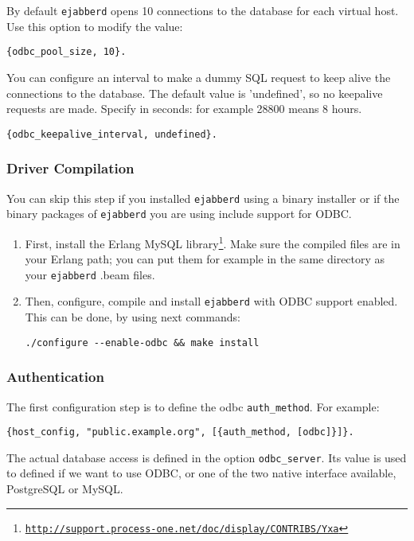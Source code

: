 \documentclass[a4paper,10pt]{book}
\newcommand{\ind}[1]{\begin{latexonly}\index{#1}\end{latexonly}}
\newcommand{\term}[1]{\texttt{#1}}
\newcommand{\ejabberd}{\texttt{ejabberd}}
\gdef\footahref#1#2{#2\footnote{\href{#1}{\texttt{#1}}}}
\begin{document}
By default \ejabberd{} opens 10 connections to the database for each virtual host.
Use this option to modify the value:
\begin{verbatim}
{odbc_pool_size, 10}.
\end{verbatim}

You can configure an interval to make a dummy SQL request 
to keep alive the connections to the database. 
The default value is 'undefined', so no keepalive requests are made. 
Specify in seconds: for example 28800 means 8 hours.
\begin{verbatim}
{odbc_keepalive_interval, undefined}.
\end{verbatim}

\subsubsection{Driver Compilation}
\label{compileodbc}

You can skip this step if you installed \ejabberd{} using a binary installer or
if the binary packages of \ejabberd{} you are using include support for
ODBC.

\begin{enumerate}
\item First, install the \footahref{http://support.process-one.net/doc/display/CONTRIBS/Yxa}{Erlang
  MySQL library}. Make sure the compiled files are in your Erlang path; you can
  put them for example in the same directory as your \ejabberd{} .beam files.
\item Then, configure, compile and install \ejabberd{} with ODBC support
  enabled. This can be done, by using next commands:
  \begin{verbatim}
./configure --enable-odbc && make install
\end{verbatim}
\end{enumerate}

\subsubsection{Authentication}
\label{odbcauth}
\ind{ODBC!authentication}

The first configuration step is to define the odbc \term{auth\_method}. For
example:
\begin{verbatim}
{host_config, "public.example.org", [{auth_method, [odbc]}]}.
\end{verbatim}

The actual database access is defined in the option \term{odbc\_server}. Its
value is used to defined if we want to use ODBC, or one of the two native
interface available, PostgreSQL or MySQL.
\end{document}
